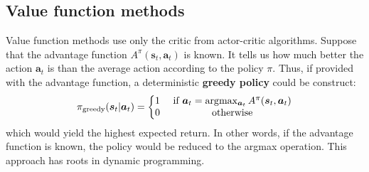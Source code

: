  
%
%
%
%
%

\subsection{Value function methods}
Value function methods use only the critic from actor-critic algorithms.
Suppose that the advantage function $ A^{ \pi } (\bm{s}_{t}, \bm{a}_{t} )  $ is known.
It tells us how much better the action $ \bm{a}_{t}  $ is than the average action
according to the policy $ \pi  $.
Thus, if provided with the advantage function, a deterministic 
\textbf{greedy policy} could be construct:
\begin{equation}
		\label{eq-greedy-pi}
		\pi_{ \text{greedy} }(\bm{s}_{t}| \bm{a}_{t}) = \left\{ 
\begin{matrix}
		1 & \text{ if } \bm{a}_t = \arg\!\max_{\bm{a}_t} A^\pi (\bm{s}_{t}, \bm{a}_{t}) 		 \\
		0 & \text{ otherwise}
\end{matrix}
		\right.
\end{equation}
which would yield the highest expected return.
In other words, if the advantage function is known, the policy would be
reduced to the argmax operation.
This approach has roots in dynamic programming.

